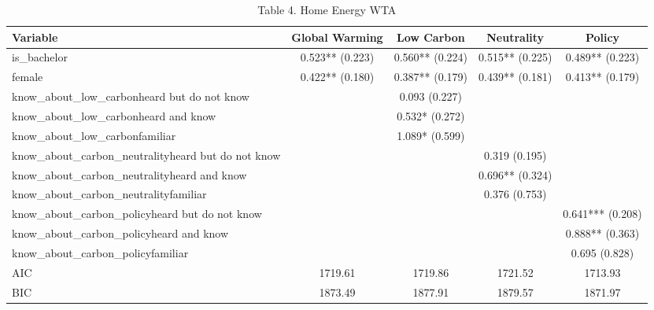 \begin{table}[!htbp]
\centering
\caption{Table 4. Home Energy WTA}
\begin{tabular}{lcccc}
\hline
Variable & Global Warming & Low Carbon & Neutrality & Policy \\
\hline
is\_bachelor & 0.523** (0.223) & 0.560** (0.224) & 0.515** (0.225) & 0.489** (0.223) \\
female & 0.422** (0.180) & 0.387** (0.179) & 0.439** (0.181) & 0.413** (0.179) \\
know\_about\_low\_carbonheard but do not know &  & 0.093 (0.227) &  &  \\
know\_about\_low\_carbonheard and know &  & 0.532* (0.272) &  &  \\
know\_about\_low\_carbonfamiliar &  & 1.089* (0.599) &  &  \\
know\_about\_carbon\_neutralityheard but do not know &  &  & 0.319 (0.195) &  \\
know\_about\_carbon\_neutralityheard and know &  &  & 0.696** (0.324) &  \\
know\_about\_carbon\_neutralityfamiliar &  &  & 0.376 (0.753) &  \\
know\_about\_carbon\_policyheard but do not know &  &  &  & 0.641*** (0.208) \\
know\_about\_carbon\_policyheard and know &  &  &  & 0.888** (0.363) \\
know\_about\_carbon\_policyfamiliar &  &  &  & 0.695 (0.828) \\
AIC & 1719.61 & 1719.86 & 1721.52 & 1713.93 \\
BIC & 1873.49 & 1877.91 & 1879.57 & 1871.97 \\
\hline
\end{tabular}
\end{table}
